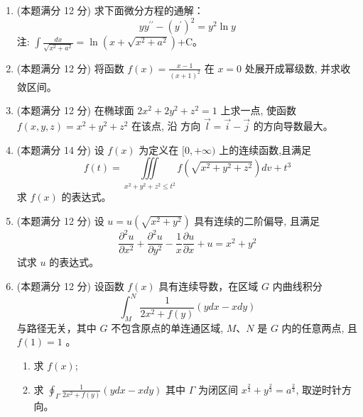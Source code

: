 \begin{enumerate}
\item 
(本题满分 12 分)
求下面微分方程的通解：
\[ 
y y^{\prime \prime}-\left(y^{\prime}\right)^{2}=y^{2} \ln y
 \]
注: $\int \frac{d x}{\sqrt{x^{2} + a^{2}}}=\ln \left(x+\sqrt{x^{2} + a^{2}}\right)$+C。




\item 
(本题满分 12 分)
将函数 $f(x)=\frac{x-1}{(x+1)^{2}}$ 在 $x=0$ 处展开成幂级数, 并求收敛区间。




\item
(本题满分 12 分)
在椭球面 $2 x^{2}+2 y^{2}+z^{2}=1$ 上求一点, 使函数 $f(x, y, z)=x^{2}+y^{2}+z^{2}$ 在该点, 沿 方向 $\vec{l}=\vec{i}-\vec{j}$ 的方向导数最大。



\newpage
\item 
(本题满分 14 分)
设 $f(x)$ 为定义在 $[0,+\infty)$ 上的连续函数,且满足
\[ 
f(t)=\iiint\limits_{x^{2}+y^{2}+z^{2} \leqslant t^{2}} f\left(\sqrt{x^{2}+y^{2}+z^{2}}\right) d v+t^{3}
 \]
求 $f(x)$ 的表达式。




\item 
(本题满分 12 分)
设 $u=u\left(\sqrt{x^{2}+y^{2}}\right)$ 具有连续的二阶偏导, 且满足 
\[ 
\frac{\partial^{2} u}{\partial x^{2}}+\frac{\partial^{2} u}{\partial y^{2}}-\frac{1}{x} \frac{\partial u}{\partial x}+u=x^{2}+y^{2}
 \]
 试求 $u$ 的表达式。


\item 
(本题满分 12 分)
设函数 $f(x)$ 具有连续导数，在区域 $G$ 内曲线积分
\[ 
\int_{M}^{N} \frac{1}{2 x^{2}+f(y)}(y d x-x d y)
 \]
与路径无关，其中 $G$ 不包含原点的单连通区域, $M 、 N$ 是 $G$ 内的任意两点, 且 $f(1)=1$ 。
\begin{enumerate}
	\item
 求 $f(x)$;
\item 
求 $\oint_{\Gamma} \frac{1}{2 x^{2}+f(y)}(y d x-x d y)$ 其中 $\Gamma$ 为闭区间 $x^{\frac{2}{3}}+y^{\frac{2}{3}}=a^{\frac{2}{3}}$, 取逆时针方向。
\end{enumerate}


\end{enumerate}
